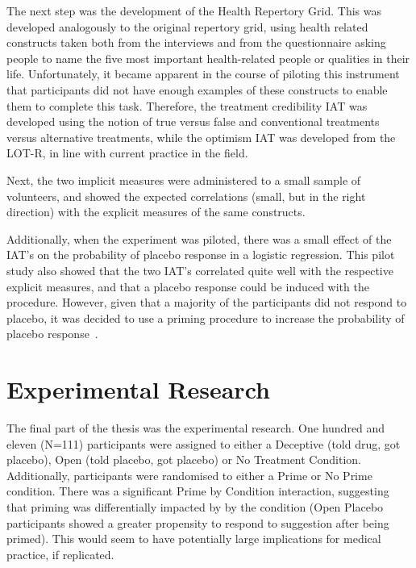The next step was the development of the Health Repertory Grid. This
was developed analogously to the original repertory grid, using health
related constructs taken both from the interviews and from the
questionnaire asking people to name the five most important
health-related people or qualities in their life. Unfortunately, it
became apparent in the course of piloting this instrument that
participants did not have enough examples of these constructs to
enable them to complete this task. Therefore, the treatment
credibility IAT was developed using the notion of true versus false
and conventional treatments versus alternative treatments, while the
optimism IAT was developed from the LOT-R, in line with current
practice in the field.

Next, the two implicit measures were administered to a small sample of
volunteers, and showed the expected correlations (small, but in the
right direction) with the explicit measures of the same constructs.

Additionally, when the experiment was piloted, there was a small
effect of the IAT's on the probability of placebo response in a
logistic regression. This pilot study also showed that the two IAT's
correlated quite well with the respective explicit measures, and that
a placebo response could be induced with the procedure. However, given
that a majority of the participants did not respond to placebo, it was
decided to use a priming procedure to increase the probability of
placebo response~\cite{Geers2005a}.

\section{Experimental Research}
\label{sec:exper-rese}

The final part of the thesis was the experimental research. One
hundred and eleven (N=111) participants were assigned to either a
Deceptive (told drug, got placebo), Open (told placebo, got placebo)
or No Treatment Condition. Additionally, participants were randomised
to either a Prime or No Prime condition. %
There was a significant Prime by Condition interaction,
suggesting that priming was differentially impacted by by the
condition (Open Placebo participants showed a greater propensity to
respond to suggestion after being primed). This would seem to have
potentially large implications for medical practice, if replicated.

